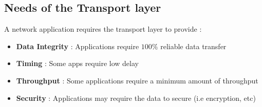 \documentclass[twoside]{article}
\begin{document}
\subsection{Needs of the Transport layer}
A network application requires the transport layer to provide :
\begin{itemize}
\item \textbf{Data Integrity} : Applications require \(100\%\) reliable data transfer
\item \textbf{Timing} : Some apps require low delay
\item \textbf{Throughput} : Some applications require a minimum amount of throughput
\item \textbf{Security} : Applications may require the data to secure (i.e encryption, etc)
\end{itemize}
\end{document}
